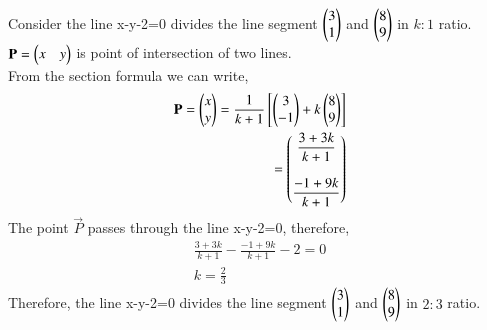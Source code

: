 \documentclass[journal,12pt,twocolumn]{IEEEtran}
\begin{document}
\begin{enumerate}
\solution Consider the line x-y-2=0 divides the line segment $\begin{pmatrix}3 \\1\end{pmatrix}$ and $\begin{pmatrix}8\\9\end{pmatrix} $ in $k:1$ ratio.\\
$\mathbf{P}=\begin{pmatrix}x& y\end{pmatrix} $ is point of intersection of two lines.\\ 
From the section formula we can write,
\begin{align}
\mathbf{P} = \begin{pmatrix}x\\ y\end{pmatrix} = \displaystyle\frac{1}{k+1}\left[\begin{pmatrix}3\\-1\end{pmatrix}+ k\begin{pmatrix}8\\9\end{pmatrix}\right]\\
 = \begin{pmatrix}\displaystyle\frac{3+3k}{k+1} \\\\ \displaystyle\frac{-1+9k}{k+1}\end{pmatrix}
\end{align}
The point $\vec{P}$ passes through the line x-y-2=0, therefore,
\begin{align}
\displaystyle\frac{3+3k}{k+1} - \displaystyle\frac{-1+9k}{k+1} -2 = 0\\
k=\displaystyle\frac{2}{3}
\end{align}
Therefore, the line x-y-2=0 divides the line segment $\begin{pmatrix}3 \\1\end{pmatrix}$ and $\begin{pmatrix}8\\9\end{pmatrix} $ in $2:3$ ratio.
\end{enumerate}
\end{document}
